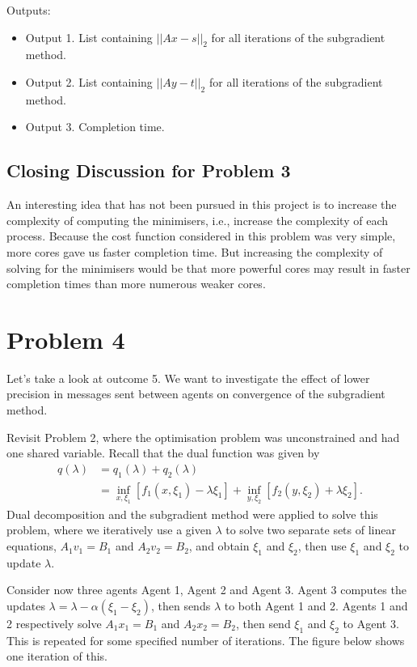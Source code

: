 \documentclass[12pt]{article}
\begin{document}
Outputs:
\begin{itemize}
	\item Output 1. List containing $||Ax-s||_2$ for all iterations of the subgradient method.
	\item Output 2. List containing $||Ay-t||_2$ for all iterations of the subgradient method.
	\item Output 3. Completion time.
\end{itemize}

\subsection*{Closing Discussion for Problem 3}

An interesting idea that has not been pursued in this project is to increase the complexity of computing the minimisers, i.e., increase the complexity of each process. Because the cost function considered in this problem was very simple, more cores gave us faster completion time. But increasing the complexity of solving for the minimisers would be that more powerful cores may result in faster completion times than more numerous weaker cores.

\section*{Problem 4}

Let's take a look at outcome 5. We want to investigate the effect of lower precision in messages sent between agents on convergence of the subgradient method.

Revisit Problem 2, where the optimisation problem was unconstrained and had one shared variable. Recall that the dual function was given by
\begin{align*}
q(\lambda)&=q_1(\lambda)+q_2(\lambda)\\
&=\inf_{x,\xi_1}[f_1(x,\xi_1)-\lambda\xi_1]+\inf_{y,\xi_2}[f_2(y,\xi_2)+\lambda\xi_2].
\end{align*}
Dual decomposition and the subgradient method were applied to solve this problem, where we iteratively use a given $\lambda$ to solve two separate sets of linear equations, $A_1v_1=B_1$ and $A_2v_2=B_2$, and obtain $\xi_1$ and $\xi_2$, then use $\xi_1$ and $\xi_2$ to update $\lambda$.

Consider now three agents Agent 1, Agent 2 and Agent 3. Agent 3 computes the updates $\lambda=\lambda-\alpha(\xi_1-\xi_2)$, then sends $\lambda$ to both Agent 1 and 2. Agents 1 and 2 respectively solve $A_1x_1=B_1$ and $A_2x_2=B_2$, then send $\xi_1$ and $\xi_2$ to Agent 3. This is repeated for some specified number of iterations. The figure below shows one iteration of this.
\end{document}
